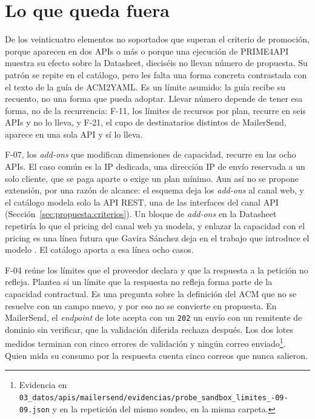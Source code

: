\section{Lo que queda fuera}\label{sec:esquema:fuera}\label{sec:evolucion:fuera}

De los veinticuatro elementos no soportados que superan el criterio de promoción, porque aparecen en dos APIs o más o porque una ejecución de PRIME4API muestra su efecto sobre la Datasheet, dieciséis no llevan número de propuesta.
Su patrón se repite en el catálogo, pero les falta una forma concreta contrastada con el texto de la guía de ACM2YAML.
Es un límite asumido: la guía recibe su recuento, no una forma que pueda adoptar.
Llevar número depende de tener esa forma, no de la recurrencia: F-11, los límites de recursos por plan, recurre en seis APIs y no lo lleva, y F-21, el cupo de destinatarios distintos de MailerSend, aparece en una sola API y sí lo lleva.

\label{subsec:evolucion:f07}F-07, los \textit{add-ons} que modifican dimensiones de capacidad, recurre en las ocho APIs.
El caso común es la IP dedicada, una dirección IP de envío reservada a un solo cliente, que se paga aparte o exige un plan mínimo.
Aun así no se propone extensión, por una razón de alcance: el esquema deja los \textit{add-ons} al canal web, y el catálogo modela solo la API REST, una de las interfaces del canal API (Sección~\ref{sec:propuesta:criterios}).
Un bloque de \textit{add-ons} en la Datasheet repetiría lo que el pricing del canal web ya modela, y enlazar la capacidad con el pricing es una línea futura que Gavira Sánchez deja en el trabajo que introduce el modelo \citep{gavira2026tfm}.
El catálogo aporta a esa línea ocho casos.

F-04 reúne los límites que el proveedor declara y que la respuesta a la petición no refleja.
Plantea si un límite que la respuesta no refleja forma parte de la capacidad contractual.
Es una pregunta sobre la definición del ACM que no se resuelve con un campo nuevo, y por eso no se convierte en propuesta.
En MailerSend, el \textit{endpoint} de lote acepta con un \texttt{202} un envío con un remitente de dominio sin verificar, que la validación diferida rechaza después.
Los dos lotes medidos terminan con cinco errores de validación y ningún correo enviado\footnote{Evidencia en \texttt{03\_datos/\allowbreak apis/\allowbreak mailersend/\allowbreak evidencias/\allowbreak probe\_sandbox\_limites\_-09-09.json} y en la repetición del mismo sondeo, en la misma carpeta.}.
Quien mida su consumo por la respuesta cuenta cinco correos que nunca salieron.


